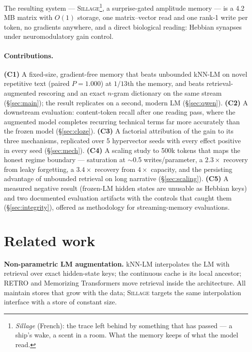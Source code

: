 \documentclass[11pt]{article}
\newcommand{\sillage}{\textsc{Sillage}}
\begin{document}
The resulting system --- \sillage{}\footnote{\emph{Sillage} (French): the trace left behind by something that has passed --- a ship's wake, a scent in a room. What the memory keeps of what the model read.}, a surprise-gated amplitude memory --- is a 4.2\,MB matrix with $O(1)$ storage, one matrix--vector read and one rank-1 write per token, no gradients anywhere, and a direct biological reading: Hebbian synapses under neuromodulatory gain control.

\paragraph{Contributions.}
\textbf{(C1)} A fixed-size, gradient-free memory that beats unbounded kNN-LM on novel repetitive text (paired $P=1.000$) at $1/13$th the memory, and beats retrieval-augmented rescoring and an exact $n$-gram dictionary on the same stream (\S\ref{sec:main}); the result replicates on a second, modern LM (\S\ref{sec:qwen}).
\textbf{(C2)} A downstream evaluation: content-token recall after one reading pass, where the augmented model completes recurring technical terms far more accurately than the frozen model (\S\ref{sec:cloze}).
\textbf{(C3)} A factorial attribution of the gain to its three mechanisms, replicated over 5 hypervector seeds with every effect positive in every seed (\S\ref{sec:mech}).
\textbf{(C4)} A scaling study to 500k tokens that maps the honest regime boundary --- saturation at $\sim$0.5 writes/parameter, a $2.3\times$ recovery from leaky forgetting, a $3.4\times$ recovery from $4\times$ capacity, and the persisting advantage of unbounded retrieval on long narrative (\S\ref{sec:scaling}).
\textbf{(C5)} A measured negative result (frozen-LM hidden states are unusable as Hebbian keys) and two documented evaluation artifacts with the controls that caught them (\S\ref{sec:integrity}), offered as methodology for streaming-memory evaluations.

\section{Related work}

\textbf{Non-parametric LM augmentation.} kNN-LM \cite{khandelwal2020} interpolates the LM with retrieval over exact hidden-state keys; the continuous cache \cite{grave} is its local ancestor; RETRO \cite{retro} and Memorizing Transformers \cite{memtrans} move retrieval inside the architecture. All maintain stores that grow with the data; \sillage{} targets the same interpolation interface with a store of constant size.
\end{document}

